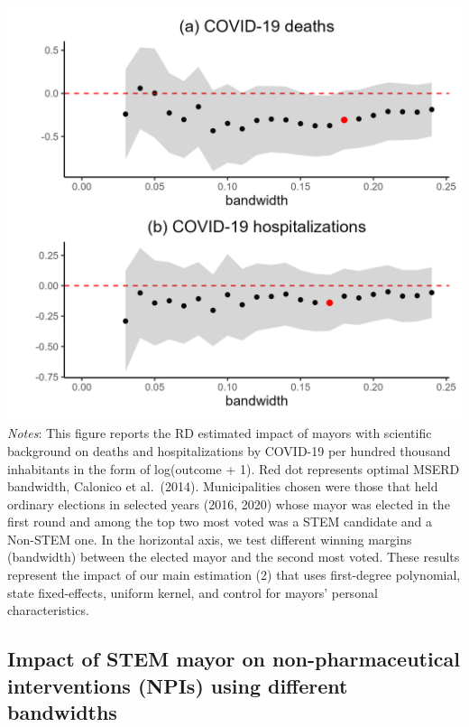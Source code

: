 \documentclass[
  letterpaper,
  DIV=11,
  numbers=noendperiod]{scrartcl}
\begin{document}
\includegraphics{outputs/figures/robust_outcomes.png} \emph{Notes}: This
figure reports the RD estimated impact of mayors with scientific
background on deaths and hospitalizations by COVID-19 per hundred
thousand inhabitants in the form of log(outcome + 1). Red dot represents
optimal MSERD bandwidth, Calonico et al.~(2014). Municipalities chosen
were those that held ordinary elections in selected years (2016, 2020)
whose mayor was elected in the first round and among the top two most
voted was a STEM candidate and a Non-STEM one. In the horizontal axis,
we test different winning margins (bandwidth) between the elected mayor
and the second most voted. These results represent the impact of our
main estimation (2) that uses first-degree polynomial, state
fixed-effects, uniform kernel, and control for mayors' personal
characteristics.

\subsection{Impact of STEM mayor on non-pharmaceutical interventions
(NPIs) using different
bandwidths}\label{impact-of-stem-mayor-on-non-pharmaceutical-interventions-npis-using-different-bandwidths}
\end{document}

